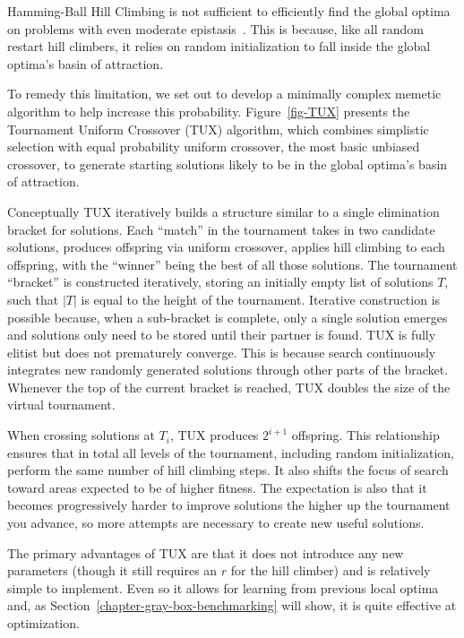 Hamming-Ball Hill Climbing is not sufficient to efficiently find the global optima
on problems with even moderate epistasis~\cite{chicano:2014:ball}. This is because,
like all random restart hill climbers, it relies on random initialization to fall
inside the global optima's basin of attraction.

To remedy this limitation, we set out to develop a minimally complex memetic
algorithm to help increase this probability. Figure~\ref{fig-TUX} presents
the Tournament Uniform Crossover (TUX) algorithm, which combines simplistic
selection with equal probability uniform crossover, the most basic unbiased crossover, to generate starting
solutions likely to be in the global optima's basin of attraction.

Conceptually TUX iteratively builds a structure similar to a single elimination
bracket for solutions. Each ``match'' in the tournament takes in two candidate solutions,
produces offspring via uniform crossover, applies hill climbing to each offspring, with
the ``winner'' being the best of all those solutions. The tournament ``bracket'' is constructed
iteratively, storing an initially empty list of solutions $T$, such that $|T|$ is equal to the height
of the tournament. Iterative construction is possible because, %
when a sub-bracket is complete, %
only a single solution
emerges and solutions only need to be stored until their partner is found.
TUX is fully elitist but does not prematurely converge. This is because search continuously
integrates new randomly generated solutions through other parts of the bracket. Whenever the
top of the current bracket is reached, TUX doubles the size of the virtual tournament.

When crossing solutions at $T_i$, TUX produces $2^{i+1}$ offspring. This relationship
ensures that in total all levels of the tournament, including random initialization,
perform the same number of hill climbing steps. It also shifts the focus of search toward
areas expected to be of higher fitness. The expectation is also that it becomes progressively
harder to improve solutions the higher up the tournament you advance, so more attempts
are necessary to create new useful solutions.

The primary advantages of TUX are that it does not introduce any new parameters (though it still
requires an $r$ for the hill climber) and is relatively simple to implement. Even so
it allows for learning from previous local optima and, %
as Section~\ref{chapter-gray-box-benchmarking} will show, %
it is quite effective at optimization.
